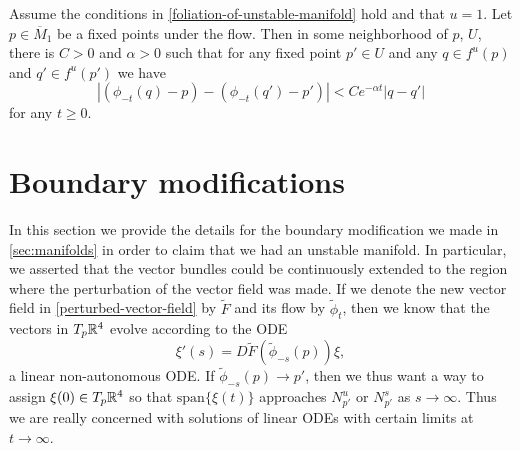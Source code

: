 \begin{prop}
	Assume the conditions in \cref{foliation-of-unstable-manifold} hold and that \(u = 1\). Let \(p \in \overline{M}_1\) be a fixed points under the flow. Then in some neighborhood of \(p\), \(U\), there is \(C> 0 \) and \(\alpha > 0\) such that for any fixed point \(p'\in U\) and any \(q \in f^u(p)\) and \(q'\in f^u(p')\) we have
	\begin{equation}
		|(\phi_{-t}(q) - p) - (\phi_{-t}(q') - p')| < C e^{-\alpha t} | q - q'|
	\end{equation}
	for any \(t\geq 0.\)
\end{prop}
\section{Boundary modifications}\label{sec:boundary-modifications}

In this section we provide the details for the boundary modification we made in \cref{sec:manifolds} in order to claim that we had an unstable manifold. In particular, we asserted that the vector bundles could be continuously extended to the region where the perturbation of the vector field was made. If we denote the new vector field in \cref{perturbed-vector-field} by \(\tilde F\) and its flow by \(\tilde \phi_t\), then we know that the vectors in \(T_p\mathbb{R}^4\) evolve according to the ODE
\begin{equation}\label{flow-tangent-vectors-perturbed}
	\xi'(s) = D\tilde F(\tilde \phi_{-s}(p)) \xi,
\end{equation}
a linear non-autonomous ODE. If \(\tilde \phi_{-s}(p) \to p'\), then we thus want a way to assign \(\xi(0) \in T_p\mathbb{R}^4\) so that \(\mathrm{span}\{\xi(t)\}\) approaches \(N^u_{p'}\) or \(N^s_{p'}\) as \(s\to \infty\). Thus we are really concerned with solutions of linear ODEs with certain limits at \(t\to\infty\).

